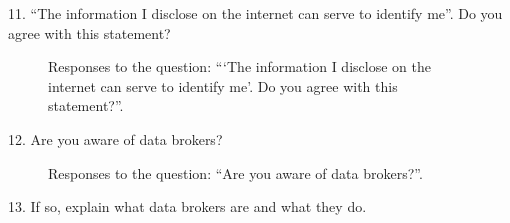 11. ``The information I disclose on the internet can serve to identify me''. Do you agree with this statement?

\begin{figure}[H]
    \begin{center}
        \caption*{Responses to the question: ```The information I disclose on the internet can serve to identify me'. Do you agree with this statement?''.}
        \label{fig:survey_s5_q11}
    \end{center}
\end{figure}

\vspace{2cm}

12. Are you aware of data brokers?\\

\begin{figure}[H]
    \centering
    \caption*{Responses to the question: ``Are you aware of data brokers?''.}
    \label{fig:survey_s5_q12}
\end{figure}

\clearpage

13. If so, explain what data brokers are and what they do.

